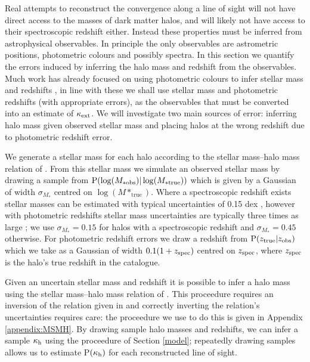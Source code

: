 \documentclass[useAMS,usenatbib]{mn2e}
\begin{document}
Real attempts to reconstruct the convergence along a line of sight will not have direct access to the masses of dark matter halos, 
and will likely not have access to their spectroscopic redshift either. Instead these properties must be inferred from astrophysical
observables. In principle the only observables are astrometric positions, photometric colours and possibly spectra. In this section we
quantify the errors induced by inferring the halo mass and redshift from the observables. Much work has already focused on using
photometric colours to infer stellar mass \citep[\eg][]{xxx} and redshifts \citep[\eg][]{BPZ}, in line with these we shall use
stellar mass and photometric redshifts (with appropriate errors), as the observables that must be converted into an estimate
of $\kappa_{\rm ext}$. We will investigate two main sources of error: inferring halo mass given observed stellar mass and placing halos at the wrong redshift due to photometric redshift error.

We generate a stellar mass for each halo according to the stellar mass--halo mass relation of \citet{BehrooziEtal2010}. From this stellar mass we simulate 
an observed stellar mass by drawing a sample from ${\rm P}(\log(M_{* \mathrm {obs}})|\log(M_{* \mathrm {true}}))$ which is given by a Gaussian of width $\sigma_{M_*}$ centred on $\log(M*_{\mathrm {true}})$. Where a spectroscopic redshift exists stellar masses can be estimated with typical uncertainties of 0.15 dex \citep{xxx}, however with photometric redshifts stellar mass uncertainties are typically three times as large \citep{xxx}; we use $\sigma_{M_*}=0.15$ for halos with a spectroscopic redshift and $\sigma_{M_*}=0.45$ otherwise. For photometric redshift errors we draw a redshift from ${\rm P}(z_{\rm true}|z_{\rm obs})$ which we take as a Gaussian of width $0.1(1+z_{\rm spec})$ centred on $z_{\rm spec}$, where $z_{\rm spec}$ is the halo's true redshift in the \MS catalogue.

Given an uncertain stellar mass and redshift it is possible to infer a halo mass using the stellar mass--halo mass relation of \citet{BehrooziEtal2010}. This proceedure requires an inversion of the relation given in \citet{BehrooziEtal2010} and correctly inverting the relation's uncertainties requires care: the proceedure we use to do this is given in Appendix \ref{appendix:MSMH}. By drawing sample halo masses and redshifts, we can infer a sample $\kappa_{\rm h}$ using the proceedure of Section \ref{model}; repeatedly drawing samples allows us to estimate P$(\kappa_{\rm h})$ for each reconstructed line of sight.
\end{document}
